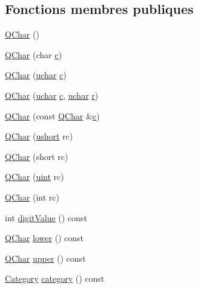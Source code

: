 \subsection*{Fonctions membres publiques}
\begin{DoxyCompactItemize}
\item 
\hyperlink{class_q_char_a982aca321d746686396ab5290955da95}{Q\+Char} ()
\item 
\hyperlink{class_q_char_a9d4a3fc3b41479f13c1174995d1390d5}{Q\+Char} (char \hyperlink{060__command__switch_8tcl_ab14f56bc3bd7680490ece4ad7815465f}{c})
\item 
\hyperlink{class_q_char_a4b67f8efac359d10c3c2b279624d1002}{Q\+Char} (\hyperlink{qglobal_8h_a65f85814a8290f9797005d3b28e7e5fc}{uchar} \hyperlink{060__command__switch_8tcl_ab14f56bc3bd7680490ece4ad7815465f}{c})
\item 
\hyperlink{class_q_char_a7f5f54e09c49f6ea21627b924e9240c1}{Q\+Char} (\hyperlink{qglobal_8h_a65f85814a8290f9797005d3b28e7e5fc}{uchar} \hyperlink{060__command__switch_8tcl_ab14f56bc3bd7680490ece4ad7815465f}{c}, \hyperlink{qglobal_8h_a65f85814a8290f9797005d3b28e7e5fc}{uchar} \hyperlink{060__command__switch_8tcl_a0a0bd3dc69dd06934c4e6362155e0ace}{r})
\item 
\hyperlink{class_q_char_a66d7c1c6f835a49d4486cb960c43f1da}{Q\+Char} (const \hyperlink{class_q_char}{Q\+Char} \&\hyperlink{060__command__switch_8tcl_ab14f56bc3bd7680490ece4ad7815465f}{c})
\item 
\hyperlink{class_q_char_a7145ea443cffb41db0d4ed23285831e3}{Q\+Char} (\hyperlink{qglobal_8h_ab95f123a6c9bcfee6a343170ef8c5f69}{ushort} rc)
\item 
\hyperlink{class_q_char_a548ce01f65d8afbaff0d03c78d5453da}{Q\+Char} (short rc)
\item 
\hyperlink{class_q_char_ab508e623fe37bdcd7d855539baaf846c}{Q\+Char} (\hyperlink{qglobal_8h_a4d3943ddea65db7163a58e6c7e8df95a}{uint} rc)
\item 
\hyperlink{class_q_char_aa16b5930b815ea41ab29112fe3d7a378}{Q\+Char} (int rc)
\item 
int \hyperlink{class_q_char_a87541b491545da7285be57716eeab6cd}{digit\+Value} () const 
\item 
\hyperlink{class_q_char}{Q\+Char} \hyperlink{class_q_char_abb5fb3d117299a8eb93fc0ed3173f6fa}{lower} () const 
\item 
\hyperlink{class_q_char}{Q\+Char} \hyperlink{class_q_char_a5f66ffe2c1fd7386541dfd88a6513213}{upper} () const 
\item 
\hyperlink{class_q_char_a62908095db0c54f35ff2ae928c621a97}{Category} \hyperlink{class_q_char_abaaecd776f6fa9619d5b79ded2815949}{category} () const 

\end{DoxyCompactItemize}
